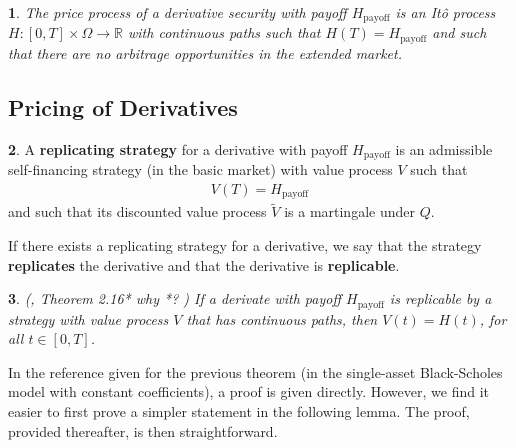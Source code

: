\documentclass[english]{article}
\newcommand{\comment}[1]{\color{blue}#1\color{black}}
\numberwithin{equation}{section}
\numberwithin{figure}{section}
\theoremstyle{bolddescit}
\newtheorem{theorem}{\protect\theoremname}[section]
\theoremstyle{definition}
\newtheorem{definition}[theorem]{\protect\definitionname}
\theoremstyle{definition}
\theoremstyle{plain}
\theoremstyle{plain}
\theoremstyle{bolddesc}
\newtheorem{assumption}[theorem]{\protect\assumptionname}
\theoremstyle{plain}
\theoremstyle{remark}
\providecommand{\assumptionname}{Assumption}
\providecommand{\definitionname}{Definition}
\providecommand{\theoremname}{Theorem}
\begin{document}
\begin{assumption}\label{ass:bs-derivative-regularity}
  The price process of a derivative security with payoff $H_\text{payoff}$ is an It\^o process $H : [0,T] \times \Omega \to \mathbb{R}$ with continuous paths such that $H(T) = H_\text{payoff}$ and such that there are no arbitrage opportunities in the extended market.
\end{assumption}

\subsection{Pricing of Derivatives}

\begin{definition}
  A \textbf{replicating strategy} for a derivative with payoff $H_\text{payoff}$ is an admissible self-financing strategy (in the basic market) with value process $V$ such that
  \begin{align*}
    V(T) = H_\text{payoff}
  \end{align*}
  and such that its discounted value process $\widetilde{V}$ is a martingale under $Q$.
\end{definition}

If there exists a replicating strategy for a derivative, we say that the strategy \textbf{replicates} the derivative and that the derivative is \textbf{replicable}.

\begin{theorem}\label{thm:bs-repl-strat-derivative-prices}
  (\cite{capinski_blackscholes_2012}, Theorem 2.16*
\comment{why *?}
  )
  If a derivate with payoff $H_\text{payoff}$ is replicable by a strategy with value process $V$ that has continuous paths, then $V(t) = H(t)$, for all $t \in [0,T]$.
\end{theorem}

In the reference given for the previous theorem (in the single-asset Black-Scholes model with constant coefficients), a proof is given directly. However, we find it easier to first prove a simpler statement in the following lemma. The proof, provided thereafter, is then straightforward.
\end{document}
